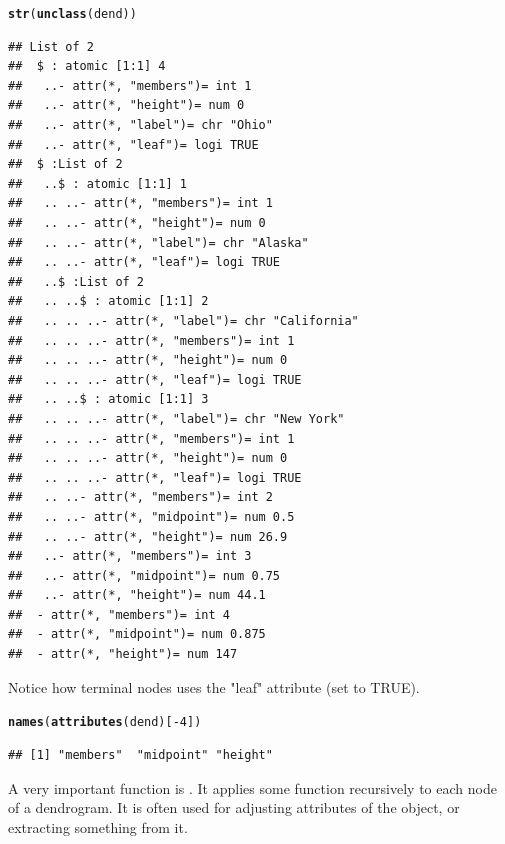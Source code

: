 \documentclass[shortnames,nojss,article]{jss}\usepackage{graphicx, color}
\makeatletter
\newcommand{\hlfunctioncall}[1]{\textcolor[rgb]{0.501960784313725,0,0.329411764705882}{\textbf{#1}}}%
\newenvironment{kframe}{%
 \def\at@end@of@kframe{}%
 \ifinner\ifhmode%
  \def\at@end@of@kframe{\end{minipage}}%
  \begin{minipage}{\columnwidth}%
 \fi\fi%
 \def\FrameCommand##1{\hskip\@totalleftmargin \hskip-\fboxsep
 \colorbox{shadecolor}{##1}\hskip-\fboxsep
     \hskip-\linewidth \hskip-\@totalleftmargin \hskip\columnwidth}%
 \MakeFramed {\advance\hsize-\width
   \@totalleftmargin\z@ \linewidth\hsize
   \@setminipage}}%
 {\par\unskip\endMakeFramed%
 \at@end@of@kframe}
\newenvironment{knitrout}{}{} %
\makeatother
\begin{document}
\begin{knitrout}
\color{fgcolor}\begin{kframe}
\begin{alltt}
\hlfunctioncall{str}(\hlfunctioncall{unclass}(dend))
\end{alltt}
\begin{verbatim}
## List of 2
##  $ : atomic [1:1] 4
##   ..- attr(*, "members")= int 1
##   ..- attr(*, "height")= num 0
##   ..- attr(*, "label")= chr "Ohio"
##   ..- attr(*, "leaf")= logi TRUE
##  $ :List of 2
##   ..$ : atomic [1:1] 1
##   .. ..- attr(*, "members")= int 1
##   .. ..- attr(*, "height")= num 0
##   .. ..- attr(*, "label")= chr "Alaska"
##   .. ..- attr(*, "leaf")= logi TRUE
##   ..$ :List of 2
##   .. ..$ : atomic [1:1] 2
##   .. .. ..- attr(*, "label")= chr "California"
##   .. .. ..- attr(*, "members")= int 1
##   .. .. ..- attr(*, "height")= num 0
##   .. .. ..- attr(*, "leaf")= logi TRUE
##   .. ..$ : atomic [1:1] 3
##   .. .. ..- attr(*, "label")= chr "New York"
##   .. .. ..- attr(*, "members")= int 1
##   .. .. ..- attr(*, "height")= num 0
##   .. .. ..- attr(*, "leaf")= logi TRUE
##   .. ..- attr(*, "members")= int 2
##   .. ..- attr(*, "midpoint")= num 0.5
##   .. ..- attr(*, "height")= num 26.9
##   ..- attr(*, "members")= int 3
##   ..- attr(*, "midpoint")= num 0.75
##   ..- attr(*, "height")= num 44.1
##  - attr(*, "members")= int 4
##  - attr(*, "midpoint")= num 0.875
##  - attr(*, "height")= num 147
\end{verbatim}
\end{kframe}
\end{knitrout}



Notice how terminal nodes uses the "leaf" attribute (set to TRUE).
\begin{knitrout}
\color{fgcolor}\begin{kframe}
\begin{alltt}
\hlfunctioncall{names}(\hlfunctioncall{attributes}(dend)[-4])
\end{alltt}
\begin{verbatim}
## [1] "members"  "midpoint" "height"
\end{verbatim}
\end{kframe}
\end{knitrout}




A very important function is . It applies some function recursively to each node of a dendrogram. It is often used for adjusting attributes of the object, or extracting something from it. 
\end{document}
